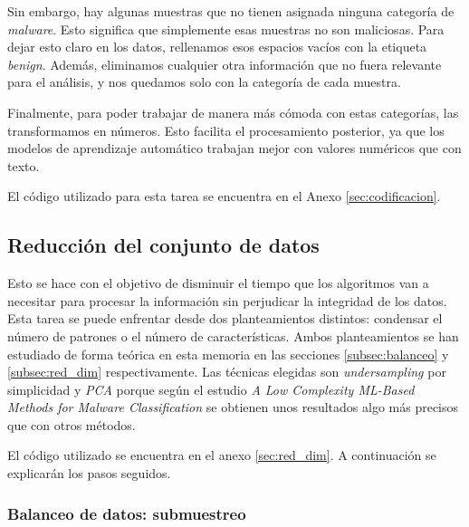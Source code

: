\vspace{1em}

Sin embargo, hay algunas muestras que no tienen asignada ninguna categoría de \textit{malware}. Esto significa que simplemente esas muestras no son maliciosas. Para dejar esto claro en los datos, rellenamos esos espacios vacíos con la etiqueta \textit{benign}. Además, eliminamos cualquier otra información que no fuera relevante para el análisis, y nos quedamos solo con la categoría de cada muestra.

\vspace{1em}

Finalmente, para poder trabajar de manera más cómoda con estas categorías, las transformamos en números. Esto facilita el procesamiento posterior, ya que los modelos de aprendizaje automático trabajan mejor con valores numéricos que con texto.

\vspace{1em}

El código utilizado para esta tarea se encuentra en el Anexo \ref{sec:codificacion}.

\subsection{Reducción del conjunto de datos}
\label{subsec:red_dataset}

Esto se hace con el objetivo de disminuir el tiempo que los algoritmos van a necesitar para procesar la información sin perjudicar la integridad de los datos. Esta tarea se puede enfrentar desde dos planteamientos distintos: condensar el número de patrones o el número de características. Ambos planteamientos se han estudiado de forma teórica en esta memoria en las secciones \ref{subsec:balanceo} y \ref{subsec:red_dim} respectivamente. Las técnicas elegidas son \textit{undersampling} por simplicidad y \textit{PCA} porque según el estudio \textit{A Low Complexity ML-Based Methods for Malware Classification} \cite{red_dim_pca} se obtienen unos resultados algo más precisos que con otros métodos.

\vspace{1em}

El código utilizado se encuentra en el anexo \ref{sec:red_dim}. A continuación se explicarán los pasos seguidos.

\subsubsection{Balanceo de datos: submuestreo}
\label{subsubsec:num_patrones}

